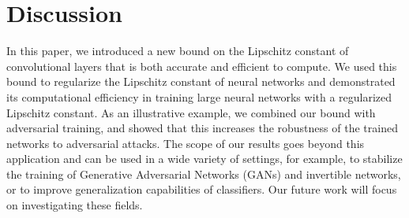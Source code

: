 \section{Discussion}
\label{section:ch5-dicussion}

In this paper, we introduced a new bound on the Lipschitz constant of convolutional layers that is both accurate and efficient to compute.
We used this bound to regularize the Lipschitz constant of neural networks and demonstrated its computational efficiency in training large neural networks with a regularized Lipschitz constant.
As an illustrative example, we combined our bound with adversarial training, and showed that this increases the robustness of the trained networks to  adversarial attacks.
The scope of our results goes beyond this application and can be used in a wide variety of settings, for example, to stabilize the training of Generative Adversarial Networks (GANs) and invertible networks, or to improve generalization capabilities of classifiers.
Our future work will focus on investigating these fields.

